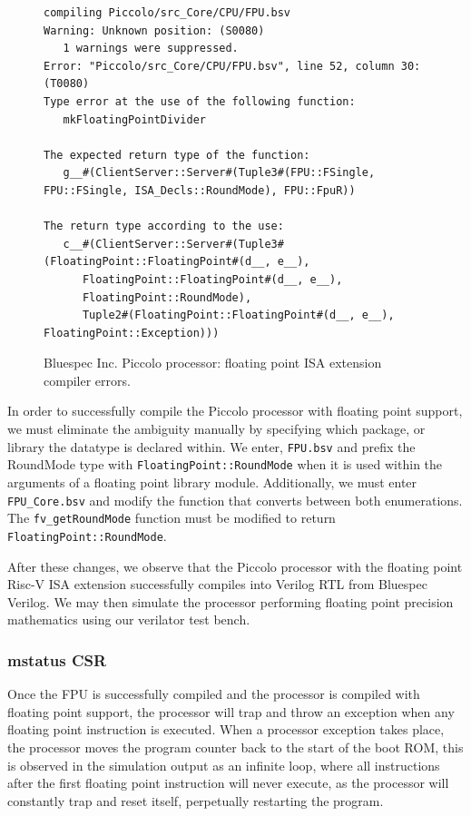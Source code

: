 \documentclass[a4paper,8pt]{report}
\begin{document}
\begin{figure}[h]
\scriptsize
\begin{verbatim}
compiling Piccolo/src_Core/CPU/FPU.bsv
Warning: Unknown position: (S0080)
   1 warnings were suppressed.
Error: "Piccolo/src_Core/CPU/FPU.bsv", line 52, column 30: (T0080)
Type error at the use of the following function:
   mkFloatingPointDivider

The expected return type of the function:
   g__#(ClientServer::Server#(Tuple3#(FPU::FSingle, FPU::FSingle, ISA_Decls::RoundMode), FPU::FpuR))

The return type according to the use:
   c__#(ClientServer::Server#(Tuple3#(FloatingPoint::FloatingPoint#(d__, e__),
      FloatingPoint::FloatingPoint#(d__, e__),
      FloatingPoint::RoundMode),
      Tuple2#(FloatingPoint::FloatingPoint#(d__, e__), FloatingPoint::Exception)))
\end{verbatim}
\normalsize
\caption{Bluespec Inc. Piccolo processor: floating point ISA extension compiler errors.}
\end{figure}

In order to successfully compile the Piccolo processor with floating point
support, we must eliminate the ambiguity manually by specifying which package,
or library the datatype is declared within. We enter, \texttt{FPU.bsv} and prefix the
RoundMode type with \texttt{FloatingPoint::RoundMode} when it is used within the
arguments of a floating point library module. Additionally, we must enter
\texttt{FPU\_Core.bsv} and modify the function that converts between both
enumerations. The \texttt{fv\_getRoundMode} function must be modified to return
\texttt{FloatingPoint::RoundMode}.

After these changes, we observe that the Piccolo processor with the
floating point Risc-V ISA extension successfully compiles into Verilog RTL from
Bluespec Verilog. We may then simulate the processor performing floating point
precision mathematics using our verilator test bench.

\subsubsection{mstatus CSR}
Once the FPU is successfully compiled and the processor is compiled with
floating point support, the processor will trap and throw an exception when any
floating point instruction is executed. When a processor exception takes place,
the processor moves the program counter back to the start of the boot ROM, this
is observed in the simulation output as an infinite loop, where all instructions
after the first floating point instruction will never execute, as the processor
will constantly trap and reset itself, perpetually restarting the program.
\end{document}
